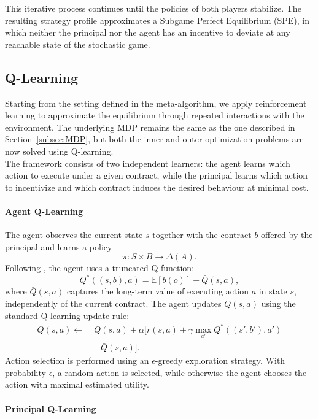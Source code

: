 \documentclass{article}
\theoremstyle{plain}
\theoremstyle{definition}
\theoremstyle{remark}
\begin{document}
This iterative process continues until the policies of both players stabilize. The resulting strategy profile approximates a Subgame Perfect Equilibrium (SPE), in which neither the principal nor the agent has an incentive to deviate at any reachable state of the stochastic game. 

\subsection{Q-Learning}
\label{subsec:Qlearning}
Starting from the setting defined in the meta-algorithm, we apply reinforcement learning to approximate the equilibrium through repeated interactions with the environment. The underlying MDP remains the same as the one described in Section~\ref{subsec:MDP}, but both the inner and outer optimization problems are now solved using Q-learning. \\
The framework consists of two independent learners:
the agent learns which action to execute under a given contract, while the principal learns which action to incentivize and which contract induces the desired behaviour at minimal cost.
\paragraph{Agent Q-Learning}

The agent observes the current state $s$ together with the contract $b$ offered by the principal and learns a policy
\[
\pi : S \times B \rightarrow \Delta(A).
\]
Following \cite{ivanov2024principal}, the agent uses a truncated Q-function:
\[
Q^{*}((s,b),a) = \mathbb{E}[b(o)] + \bar{Q}(s,a),
\]
where $\bar{Q}(s,a)$ captures the long-term value of executing action $a$ in state $s$, independently of the current contract.
The agent updates $\bar{Q}(s,a)$ using the standard Q-learning update rule:
\[
\begin{aligned}
\bar{Q}(s,a)
\leftarrow\;&
\bar{Q}(s,a)
+
\alpha
\Big[
r(s,a)
+
\gamma \max_{a'} Q^{*}((s',b'),a')
\\
&-
\bar{Q}(s,a)
\Big].
\end{aligned}
\]
Action selection is performed using an $\epsilon$-greedy exploration strategy.
With probability $\epsilon$, a random action is selected, while otherwise the agent chooses the action with maximal estimated utility.

\paragraph{Principal Q-Learning}
\end{document}
